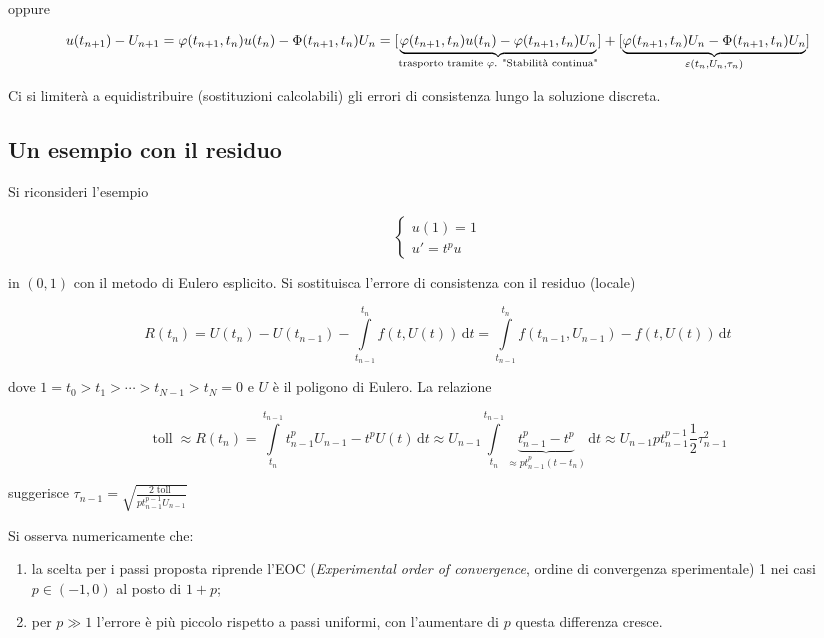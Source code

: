 \documentclass[hidelinks, 10pt]{report}
\begin{document}
oppure

\begin{dmath*}
u(t_{n + 1}) - U_{n + 1} = \varphi(t_{n + 1}, t_{n}) u(t_{n}) - \Phi (t_{n + 1}, t_{n}) U_{n} = [ \underbrace{\varphi(t_{n + 1}, t_{n}) u(t_{n}) - \varphi (t_{n + 1}, t_{n}) U_{n}}_{\text{trasporto tramite $ \varphi $. "Stabilit\`a continua"}}] + [\underbrace{\varphi (t_{n + 1}, t_{n}) U_{n} - \Phi(t_{n + 1}, t_{n}) U_{n}}_{\varepsilon(t_{n}, U_{n}, \tau_{n})}]
\end{dmath*}

Ci si limiter\`a a equidistribuire (sostituzioni calcolabili) gli errori di consistenza lungo la soluzione discreta.

\subsection{Un esempio con il residuo}
Si riconsideri l'esempio

\[
\begin{cases}
u(1) = 1 \\
u' = t^{p} u
\end{cases}
\]

in $ (0, 1) $ con il metodo di Eulero esplicito. Si sostituisca l'errore di consistenza con il residuo (locale)

\[ R(t_{n}) = U(t_{n}) - U(t_{n - 1}) - \int\limits_{t_{n - 1}}^{t_{n}} f(t, U(t)) \, \mathrm{d}t = \int\limits_{t_{n - 1}}^{t_{n}} f(t_{n - 1}, U_{n - 1}) - f(t, U(t)) \, \mathrm{d}t \] 

dove $ 1 = t_{0} > t_{1} > \dotsb > t_{N - 1} > t_{N} = 0 $ e $ U $ \`e il poligono di Eulero. La relazione

\[ \mathop{toll} \approx R(t_{n}) = \int\limits_{t_{n}}^{t_{n - 1}} t_{n -1}^{p} U_{n - 1} - t^{p} U(t) \, \mathrm{d}t \approx U_{n - 1} \int\limits_{t_{n}}^{t_{n - 1}} \underbrace{t_{n - 1}^{p} - t^{p}}_{\approx p t_{n - 1}^{p} (t - t_{n})} \, \mathrm{d}t \approx U_{n - 1} p t_{n - 1}^{p - 1} \frac{1}{2} \tau_{n - 1}^{2} \]

suggerisce $ \tau_{n - 1} = \sqrt{\frac{2 \mathop{toll}}{p t_{n - 1}^{p - 1} U_{n - 1}}} $

Si osserva numericamente che:
\begin{enumerate}
\item la scelta per i passi proposta riprende l'EOC (\emph{Experimental order of convergence}, ordine di convergenza sperimentale) 1 nei casi $ p \in (-1, 0) $ al posto di $ 1 + p $;
\item per $ p \gg 1 $ l'errore \`e pi\`u piccolo rispetto a passi uniformi, con l'aumentare di $ p $ questa differenza cresce.
\end{enumerate}
\end{document}

